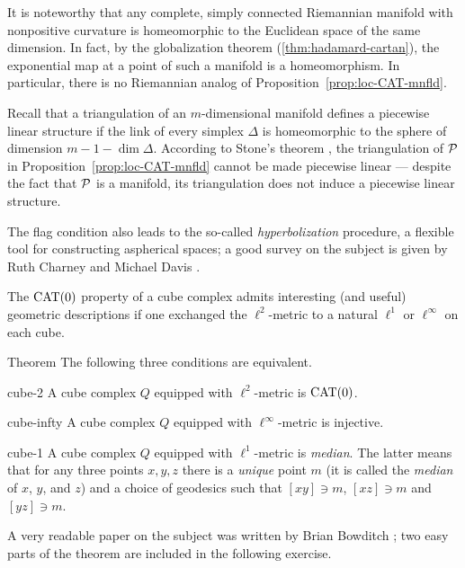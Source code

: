 It is noteworthy that any complete, simply connected Riemannian manifold with nonpositive curvature is homeomorphic to the Euclidean space of the same dimension.
In fact, by the globalization theorem
(\ref{thm:hadamard-cartan}), 
the exponential map at a point of such a manifold is a homeomorphism.
In particular, there is no Riemannian analog of Proposition~\ref{prop:loc-CAT-mnfld}.

Recall that a triangulation of an $m$-dimensional manifold defines a piecewise linear structure if the link  of every simplex $\Delta$ is homeomorphic to the sphere of dimension $m-1-\dim\Delta$.
According to Stone's theorem \cite{stone, davis-januszkiewicz}, the triangulation of $\mathcal{P}$ in Proposition~\ref{prop:loc-CAT-mnfld} 
cannot be made piecewise linear --- despite  the fact that $\mathcal{P}$ is a manifold, its triangulation does not induce a piecewise linear structure.

The flag condition also leads to the so-called {}\emph{hyperbolization} procedure, a flexible tool for constructing  aspherical spaces;
a good survey on the subject is given by Ruth Charney and Michael Davis \cite{charney-davis-1995}.

The $\mathrm{CAT}(0)$ property of a cube complex admits interesting (and useful) geometric descriptions if one exchanged the $\ell^2$-metric to a natural $\ell^1$ or $\ell^\infty$ on each cube.

\begin{thm}{Theorem}
The following three conditions are equivalent.

\begin{subthm}{cube-2} A cube complex $Q$ equipped with $\ell^2$-metric is $\mathrm{CAT}(0)$.
\end{subthm}

\begin{subthm}{cube-infty} A cube complex $Q$ equipped with $\ell^\infty$-metric is injective.
\end{subthm}

\begin{subthm}{cube-1} A cube complex $Q$ equipped with $\ell^1$-metric is \emph{median}.
 The latter means that for any three points $x,y,z$ there is a {}\emph{unique} point $m$ (it is called the \emph{median} of $x$, $y$, and $z$) and a choice of geodesics such that $[xy]\ni m$, $[xz]\ni m$ and $[yz]\ni m$.
\end{subthm}
\end{thm}

A very readable paper on the subject was written by Brian Bowditch \cite{bowditch-2020}; two easy parts of the theorem are included in the following exercise.

